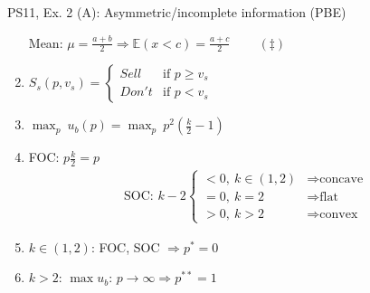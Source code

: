 \begin{frame}{PS11, Ex. 2 (A): Asymmetric/incomplete information (PBE)}
\begin{multicols}{2}
\begin{enumerate}
        \item[Mean:] \vspace{-2pt}  $\mu=\frac{a+b}{2}\Rightarrow\mathbb{E}(x<c)=\frac{a+c}{2}\quad\quad\ (\ddagger)$
        \item \vspace{-2pt} $S_s(p,v_s)=\left\{\begin{array}{ll}
          Sell  & \text{if }p\geq v_s \\
          Don't & \text{if }p < v_s
        \end{array}\right.$
        \item \vspace{-2pt} $\displaystyle{\max_p}\ u_b(p)=\displaystyle{\max_p}\ p^2\left(\frac{k}{2}-1\right)$
        \item \vspace{-2pt} FOC: $p\frac{k}{2}=p$\vspace{-6pt}
        \begin{align*}
          \text{SOC: }k-2\left\{\begin{array}{ll}
              <0,\ k\in(1,2)&\Rightarrow\text{concave}\\
              =0,\ k=2&\Rightarrow\text{flat}\\
              >0,\ k>2&\Rightarrow\text{convex}
          \end{array}\right.
        \end{align*}
        \item \vspace{-6pt} $k\in(1,2)$: FOC, SOC $\Rightarrow p^*=0$
        \item \vspace{-2pt} $k>2$: $\max u_b$: $p\rightarrow\infty\Rightarrow p^{**}=1$
      \end{enumerate}
      \vfill\null
    \end{multicols}
\end{frame}
